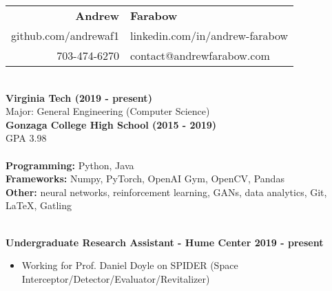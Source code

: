 \documentclass{article}
\begin{document}
  \begin{center}
    \begin{tabular}{r l}
      {\huge\textbf{Andrew}} & {\huge\textbf{Farabow}} \\
      \hspace{35pt} github.com/andrewaf1 & linkedin.com/in/andrew-farabow \\
      703-474-6270 & contact@andrewfarabow.com \\
    \end{tabular}


  \begin{flushleft}
    \begin{multicols}{2}
      {\large\textbf{\underline{}}} \\
       \textbf{Virginia Tech	(2019 - present)} \\
      Major: General Engineering (Computer Science) \\
      \textbf{Gonzaga College High School	(2015 - 2019)} \\
      GPA 3.98 \\
     

    \columnbreak
    {\large\textbf{\underline{}}} \\
    {\textbf{Programming:}} Python, Java \\
    {\textbf{Frameworks:}} Numpy, PyTorch, OpenAI Gym, OpenCV, Pandas \\
    {\textbf{Other:}} neural networks, reinforcement learning, GANs, data analytics, Git, LaTeX, Gatling \\

    \end{multicols}

    {\large\textbf{\underline{}}} \\
    \textbf{Undergraduate Research Assistant - Hume Center \hfill 2019 - present}
    \begin{itemize}
      \item Working for Prof. Daniel Doyle on SPIDER (Space Interceptor/Detector/Evaluator/Revitalizer)
    \end{itemize}



\end{flushleft}
\end{center}
\end{document}
